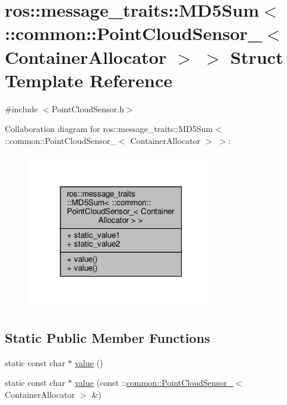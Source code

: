 \hypertarget{structros_1_1message__traits_1_1MD5Sum_3_01_1_1common_1_1PointCloudSensor___3_01ContainerAllocator_01_4_01_4}{}\section{ros\+:\+:message\+\_\+traits\+:\+:M\+D5\+Sum$<$ \+:\+:common\+:\+:Point\+Cloud\+Sensor\+\_\+$<$ Container\+Allocator $>$ $>$ Struct Template Reference}
\label{structros_1_1message__traits_1_1MD5Sum_3_01_1_1common_1_1PointCloudSensor___3_01ContainerAllocator_01_4_01_4}


{\ttfamily \#include $<$Point\+Cloud\+Sensor.\+h$>$}



Collaboration diagram for ros\+:\+:message\+\_\+traits\+:\+:M\+D5\+Sum$<$ \+:\+:common\+:\+:Point\+Cloud\+Sensor\+\_\+$<$ Container\+Allocator $>$ $>$\+:\nopagebreak
\begin{figure}[H]
\begin{center}
\leavevmode
\includegraphics[width=232pt]{de/d97/structros_1_1message__traits_1_1MD5Sum_3_01_1_1common_1_1PointCloudSensor___3_01ContainerAllocator_01_4_01_4__coll__graph}
\end{center}
\end{figure}
\subsection*{Static Public Member Functions}
\begin{DoxyCompactItemize}
\item 
static const char $\ast$ \hyperlink{structros_1_1message__traits_1_1MD5Sum_3_01_1_1common_1_1PointCloudSensor___3_01ContainerAllocator_01_4_01_4_a6f31f47bdf7c7259487b86f94e829572}{value} ()
\item 
static const char $\ast$ \hyperlink{structros_1_1message__traits_1_1MD5Sum_3_01_1_1common_1_1PointCloudSensor___3_01ContainerAllocator_01_4_01_4_a4a6f5c2d767ff03b3effaf7af8ddb92b}{value} (const \+::\hyperlink{structcommon_1_1PointCloudSensor__}{common\+::\+Point\+Cloud\+Sensor\+\_\+}$<$ Container\+Allocator $>$ \&)
\end{DoxyCompactItemize}
